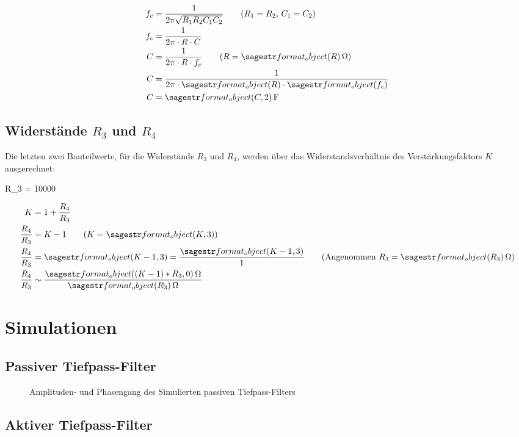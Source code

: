 \documentclass[a4paper]{hitec}
\begin{document}
\begin{align*}
    f_c &= \frac{1}{2\pi \sqrt{R_1 R_2 C_1 C_2}} \tag*{($R_1 = R_2$, $C_1 = C_2$)} \\
    f_c &= \frac{1}{2\pi \cdot R \cdot C} \\
    C &= \frac{1}{2\pi \cdot R \cdot f_c} \tag*{($R = \SIvar{R}{\ohm}$)} \\
    C &= \frac{1}{2\pi \cdot \var{R} \cdot \var{f_c}} \\
    C &= \SIvar{C, 2}{\farad}
\end{align*}

\subsection{Widerstände $R_3$ und $R_4$}

Die letzten zwei Bauteilwerte, für die Widerstände $R_3$ und $R_4$, werden über das Widerstandsverhältnis des Verstärkungsfaktors $K$ ausgerechnet:

\begin{sagesilent}
    R_3 = 10000
\end{sagesilent}

\begin{align*}
    K &= 1 + \frac{R_4}{R_3} \\
    \frac{R_4}{R_3} &= K - 1 \tag*{($K = \var{K, 3}$)} \\
    \frac{R_4}{R_3} &= \var{K-1, 3} = \frac{\var{K-1, 3}}{1} \tag*{(Angenommen $R_3 = \SIvar{R_3}{\ohm}$)} \\
    \frac{R_4}{R_3} &\sim \frac{\SIvar{(K-1)*R_3, 0}{\ohm}}{\SIvar{R_3}{\ohm}}
\end{align*}

\section{Simulationen}

\subsection{Passiver Tiefpass-Filter }

\begin{figure}[H]
    \centering
    
    \caption{Amplituden- und Phasengang des Simulierten passiven Tiefpass-Filters}
\end{figure}

\subsection{Aktiver Tiefpass-Filter }
\end{document}
